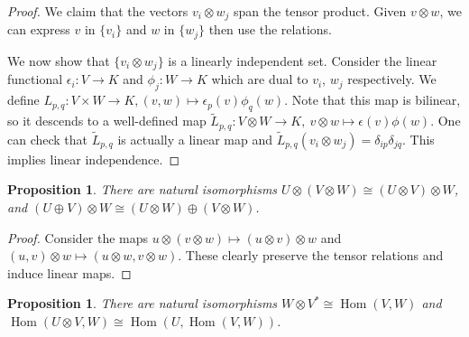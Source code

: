 \documentclass{article}
\theoremstyle{definition}
\theoremstyle{remark}
\theoremstyle{plain}
\newtheorem{prop}[defn]{Proposition}
\newcommand{\Hom}{\operatorname{Hom}}
\begin{document}
\begin{proof}
   We claim that the vectors $v_i\otimes w_j$ span the tensor product. Given $v\otimes w$, we can express $v$ in $\{v_i\}$ and $w$ in $\{w_j\}$ then use the relations. 
   
   We now show that $\{v_i\otimes w_j\}$ is a linearly independent set. Consider the linear functional $\epsilon_i:V\to K$ and $\phi_j:W\to K$ which are dual to $v_i$, $w_j$ respectively. We define $L_{p,q}:V\times W\to K, (v,w)\mapsto \epsilon_p(v)\phi_q(w)$. Note that this map is bilinear, so it descends to a well-defined map $\tilde L_{p,q}:V\otimes W\to K,\ v\otimes w\mapsto \epsilon(v)\phi(w)$.  One can check that $\tilde L_{p,q}$ is actually a linear map and $\tilde L_{p,q}(v_i\otimes w_j)=\delta_{ip}\delta_{jq}$. This implies linear independence.
\end{proof}
\begin{prop}
    There are natural isomorphisms $U\otimes(V\otimes W)\cong (U\otimes V)\otimes W$, and $(U\oplus V)\otimes W\cong (U\otimes W)\oplus (V\otimes W)$.
\end{prop}
\begin{proof}
    Consider the maps $u\otimes (v\otimes w)\mapsto (u\otimes v)\otimes w$ and $(u,v)\otimes w\mapsto (u\otimes w,v\otimes w)$. These clearly preserve the tensor relations and induce linear maps.
\end{proof}
\begin{prop}
    There are natural isomorphisms $W\otimes V^\ast\cong \Hom(V,W)$ and $\Hom(U\otimes V,W)\cong\Hom(U,\Hom(V,W))$.
\end{prop}
\end{document}
